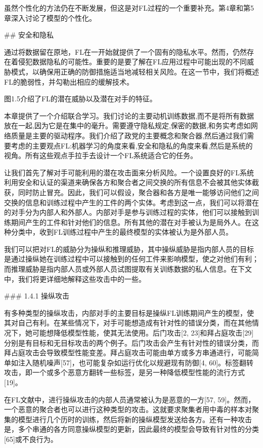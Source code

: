 虽然个性化的方法仍在不断发展，但这是对FL过程的一个重要补充。第4章和第5章深入讨论了模型的个性化。

## 安全和隐私

通过将数据留在原地，FL在一开始就提供了一个固有的隐私水平。然而，仍然存在着侵犯数据隐私的可能性。重要的是要了解在FL应用过程中可能出现的不同威胁模式，以确保用正确的防御措施适当地减轻相关风险。在这一节中，我们将概述FL的脆弱性，并勾勒出相应的缓解技术。

图1.5介绍了FL的潜在威胁以及潜在对手的特征。

本章提供了一个介绍联合学习。我们讨论的主要动机训练数据,而不是将所有数据放在一起,因为它是在集中的毫升。需要遵守隐私规定,保密的数据,和务实考虑如网络质量是主要的驱动程序。我们介绍了政党的主要概念和聚合器,然后通过我们需要考虑的主要观点FL:机器学习的角度来看,安全和隐私的角度来看,然后是系统的视角。所有这些观点手拉手去设计一个FL系统适合它的任务。

让我们首先了解对手可能利用的潜在攻击面来分析风险。一个设置良好的FL系统利用安全和认证的渠道来确保各方和聚合者之间交换的所有信息不会被其他实体截获，同时防止冒充。因此，我们可以假设，聚合器和各方是唯一能够访问他们之间交换的信息和训练过程中产生的工件的两个实体。考虑到这一点，我们可以将潜在的对手分为内部人和外部人。内部对手是参与训练过程的实体，他们可以接触到训练期间产生的工件和针对他们的信息。所有其他的潜在对手被认为是局外人。在这种分类中，收到FL训练过程中产生的最终模型的实体被认为是外部人员。

我们可以把对FL的威胁分为操纵和推理威胁，其中操纵威胁是指内部人员的目标是通过操纵她在训练过程中可以接触到的任何工件来影响模型，使之对他们有利；而推理威胁是指内部人员或外部人员试图提取有关训练数据的私人信息。在下文中，我们将更详细地解释这些攻击中的一些。

### 1.4.1 操纵攻击

有多种类型的操纵攻击，内部对手的主要目标是操纵FL训练期间产生的模型，使其对自己有利。在某些情况下，对手可能想造成有针对性的错误分类，而在其他情况下，她可能想降低模型性能，使其无法使用。后门攻击[2, 23]和拜占庭攻击[29]分别是有目标和无目标攻击的两个例子。后门攻击会产生有针对性的错误分类，而拜占庭攻击会导致模型性能变差。拜占庭攻击可能由单方或多方串通进行，可能简单如注入随机噪声[57]，也可能复杂如运行优化以规避现有防御[4, 60]。标签翻转攻击，即一个或多个恶意方翻转一些标签，是另一种降低模型性能的流行方式[19]。

在FL文献中，进行操纵攻击的内部人员通常被认为是恶意的一方[57, 59]。然而，一个恶意的聚合者也可以进行这种类型的攻击。这就要求聚集者用中毒的样本对聚集的模型进行几个历时的训练，然后将新的操纵模型发送给各方。还有一种攻击是，多个串通的各方同意操纵模型的更新，因此最终的模型会导致有针对性的分类[65]或不良行为。

